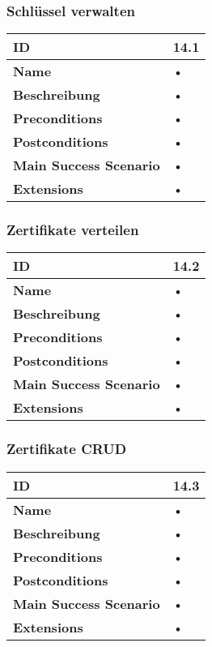 \subsubsection{Schlüssel verwalten}
\mbox{}
\begin{longtable}{| p{4cm} | p{11.7cm} |}
 \hline
 \textbf{ID} & 14.1\\ \hline 
 \textbf{Name} & • \\ \hline 
 \textbf{Beschreibung} & • \\ \hline 
 \textbf{Preconditions} & • \\ \hline 
 \textbf{Postconditions} & • \\ \hline 
 \textbf{Main Success Scenario} & • \\ \hline 
 \textbf{Extensions} & • \\ \hline 
 \end{longtable}
 
\subsubsection{Zertifikate verteilen}
\mbox{}
\begin{longtable}{| p{4cm} | p{11.7cm} |}
 \hline
 \textbf{ID} & 14.2\\ \hline 
 \textbf{Name} & • \\ \hline 
 \textbf{Beschreibung} & • \\ \hline 
 \textbf{Preconditions} & • \\ \hline 
 \textbf{Postconditions} & • \\ \hline 
 \textbf{Main Success Scenario} & • \\ \hline 
 \textbf{Extensions} & • \\ \hline 
 \end{longtable}
 
\subsubsection{Zertifikate CRUD}
\mbox{}
\begin{longtable}{| p{4cm} | p{11.7cm} |}
 \hline
 \textbf{ID} & 14.3\\ \hline 
 \textbf{Name} & • \\ \hline 
 \textbf{Beschreibung} & • \\ \hline 
 \textbf{Preconditions} & • \\ \hline 
 \textbf{Postconditions} & • \\ \hline 
 \textbf{Main Success Scenario} & • \\ \hline 
 \textbf{Extensions} & • \\ \hline 
 \end{longtable} 
 
